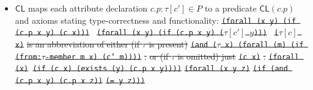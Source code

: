 \documentclass[10pt,fleqn,final]{scrreprt}
\newcommand*{\CL}{\ensuremath{\mathsf{CL}}\xspace}
\newenvironment{definitions}[0]{\medskip }{}
\newcommand{\white}[1]{{\color{white}{#1}}}
\newcommand{\qqquad}{\white{x}\qquad}
\providecommand{\DIFdel}[1]{{\protect\color{red}\sout{#1}}}                      %
\providecommand{\DIFdelbegin}{} %
\begin{document}
\begin{definitions}
\begin{itemize}[topsep=0pt, label=--, leftmargin=*]
  \item $\CL$
maps each attribute declaration $c.p : \tau[c'] \in P$
to a predicate $\CL(c.p)$
and axioms stating type-correctness and functionality:
\DIFdelbegin %
\texttt{\DIFdel{(forall (x y) (if (c.p x y) (c x))) }}
\texttt{\DIFdel{(forall (x y) (if (c.p x y) ($\tau[c']$ $y$))) }}%
\texttt{\DIFdel{($\tau[c]$ x)}} %
\DIFdel{is an abbreviation of either (if $\tau$ is present) }%
\texttt{\DIFdel{(and ($\tau$ x) (forall (m) (if (from:$\tau$-member m x) (c' m))))}}%
\DIFdel{.}%
\DIFdel{or (if $\tau$ is omitted) just }\texttt{\DIFdel{(c x)}}%
\DIFdel{.}%
\texttt{\DIFdel{(forall (x)}%
\DIFdel{(if (c x) (exists (y) (c.p x y))))}}
\texttt{\DIFdel{(forall (x y z)}}%
\texttt{\DIFdel{(if (and (c.p x y) (c.p x z))}}%
\texttt{\DIFdel{(= y z)))}}

\end{itemize}
\end{definitions}
\end{document}
